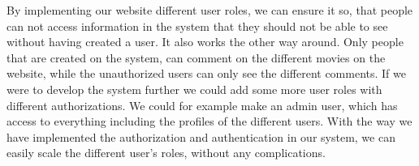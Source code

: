 By implementing our website different user roles, we can
ensure it so, that people can not access
information in the system that they should not be
able to see without having created a user.
It also works the other way around. Only people
that are created on the system, can comment on the
different movies on the website, while the unauthorized users can only see the different comments. If
we were to develop the system further we could add
some more user roles with different authorizations.
We could for example make an admin user, which has access
to everything including the profiles of the different
users. With the way we have implemented the
authorization and authentication in our system, we
can easily scale the different user's roles, without any
complications.\newline


